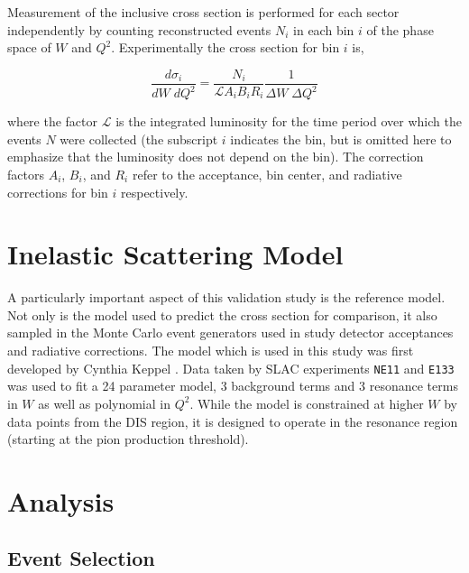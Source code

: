 Measurement of the inclusive cross section is performed for each sector independently by counting reconstructed events $N_i$ in each bin $i$ of the phase space of $W$ and $Q^2$.  Experimentally the cross section for bin $i$ is, 

\begin{equation}
	\frac{d\sigma_i}{dW \; dQ^2} = \frac{N_i}{\mathcal{L} A_i B_i R_i} \frac{1}{\Delta W \; \Delta Q^2}
\end{equation}

where the factor $\mathcal{L}$ is the integrated luminosity for the time period over which the events $N$ were collected (the subscript $i$ indicates the bin, but is omitted here to emphasize that the luminosity does not depend on the bin).  The correction factors $A_i$, $B_i$, and $R_i$ refer to the acceptance, bin center, and radiative corrections for bin $i$ respectively.  

\section{Inelastic Scattering Model}
A particularly important aspect of this validation study is the reference model.  Not only is the model used to predict the cross section for comparison, it also sampled in the Monte Carlo event generators used in study detector acceptances and radiative corrections.  The model which is used in this study was first developed by Cynthia Keppel \cite{theses-keppel:1994}.  Data taken by SLAC experiments \texttt{NE11} and \texttt{E133} was used to fit a 24 parameter model, 3 background terms and 3 resonance terms in $W$ as well as polynomial in $Q^2$.  While the model is constrained at higher $W$ by data points from the DIS region, it is designed to operate in the resonance region (starting at the pion production threshold).

\section{Analysis}
\subsection{Event Selection}

